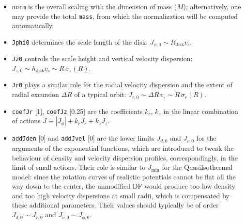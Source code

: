 \documentclass[12pt]{article}
\newcommand{\ppp}[1]{\textcolor{darkolive} {\texttt{#1}}}
\begin{document}
\begin{itemize}
\item \ppp{norm} is the overall scaling with the dimension of mass ($M$); alternatively, one may provide the total \ppp{mass}, from which the normalization will be computed automatically.
\item \ppp{Jphi0} determines the scale length of the disk: $J_{\phi,0} \sim R_\mathrm{disk}v_\circ$.
\item \ppp{Jz0} controls the scale height and vertical velocity dispersion: $J_{z,0} \sim h_\mathrm{disk}v_\circ \sim R\,\sigma_z(R)$.
\item \ppp{Jr0} plays a similar role for the radial velocity dispersion and the extent of radial excursion $\Delta R$ of a typical orbit: $J_{r,0} \sim \Delta R\,v_\circ \sim R\,\sigma_r(R)$.
\item \ppp{coefJr} [1], \ppp{coefJz} [0.25] are the coefficients $k_r$, $k_z$ in the linear combination of actions $\tilde J \equiv |J_\phi| + k_r J_r + k_z J_z$.
\item \ppp{addJden} [0] and \ppp{addJvel} [0] are the lower limits $J_{d,0}$ and $J_{v,0}$ for the arguments of the exponential functions, which are introduced to tweak the behaviour of density and velocity dispersion profiles, correspondingly, in the limit of small actions. Their role is similar to $J_\mathrm{min}$ for the QuasiIsothermal model: since the rotation curves of realistic potentials cannot be flat all the way down to the center, the unmodified DF would produce too low density and too high velocity dispersions at small radii, which is compensated by these additional parameters. Their values should typically be of order $J_{d,0} \sim J_{r,0}$ and $J_{v,0} \sim J_{\phi,0}$.
\end{itemize}
\end{document}
